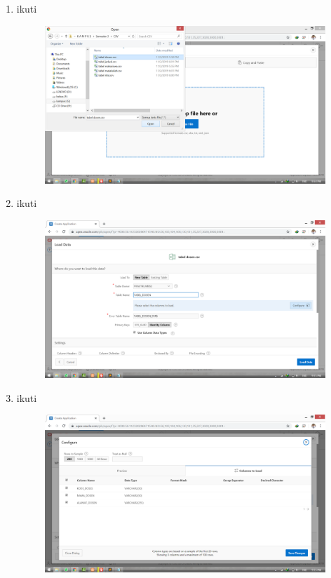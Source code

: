 \documentclass[11pt]{article}
\begin{document}
\begin{enumerate}
\item ikuti
\begin{figure}
        \centerline{\includegraphics[scale=0.1]{img/5DragTabel.png}}
        \caption{}
		\label{langkah6}
\end{figure}

\item ikuti
\begin{figure}
        \centerline{\includegraphics[scale=0.1]{img/6IsiNamaTabel.png}}
        \caption{}
		\label{langkah7}
\end{figure}

\item ikuti
\begin{figure}
        \centerline{\includegraphics[scale=0.1]{img/7ConfigTabel.png}}
        \caption{}
		\label{langkah8}
\end{figure}


\end{enumerate}
\end{document}
